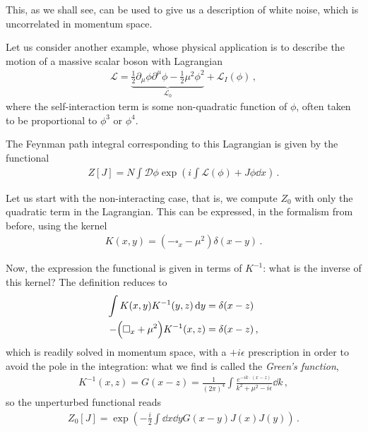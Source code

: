 \documentclass[main.tex]{subfiles}
\begin{document}
This, as we shall see, can be used to give us a description of white noise, which is uncorrelated in momentum space.

Let us consider another example, whose physical application is to describe the motion of a massive scalar boson with Lagrangian 
%
\begin{align}
\mathscr{L} = \underbrace{\frac{1}{2} \partial_{\mu } \phi \partial^{\mu } \phi - \frac{1}{2} \mu^2 \phi^2}_{\mathscr{L}_{0}}+ \mathscr{L}_I (\phi )
\,,
\end{align}
%
where the self-interaction term is some non-quadratic function of \(\phi \), often taken to be proportional to  \(\phi^3\)  or \(\phi^{4}\). 

The Feynman path integral corresponding to this Lagrangian is given by the functional 
%
\begin{align}
Z[J] = N \int \mathcal{D} \phi \exp(i \int \mathscr{L}(\phi ) +  J \phi \dd{x} )
\,.
\end{align}

Let us start with the non-interacting case, that is, we compute \(Z_0 \) with only the quadratic term in the Lagrangian. This can be expressed, in the formalism from before, using the kernel 
%
\begin{align}
K(x, y )= (- \square_x - \mu^2 ) \delta (x-y)
\,.
\end{align}

Now, the expression the functional is given in terms of \(K^{-1}\): what is the inverse of this kernel? The definition reduces to 
%
\begin{align}
\int K(x, y) K^{-1}(y, z) \dd{y} &= \delta (x-z)   \\
- \qty(\square_x + \mu^2) K^{-1} (x, z) &= \delta (x-z)
\,,
\end{align}
%
which is readily solved in momentum space, with a \(+i \epsilon \) prescription in order to avoid the pole in the integration: what we find is called the \emph{Green's function}, 
%
\begin{align}
K^{-1}(x, z) = G(x-z) = \frac{1}{(2 \pi )^{4}} \int \frac{e^{-ik \cdot (x-z)}}{k^2 + \mu^2 - i \epsilon } \dd{k} 
\,,
\end{align}
%
so the unperturbed functional reads 
%
\begin{align}
Z_0 [J] = \exp(- \frac{i}{2} \int \dd{x} \dd{y} G(x-y) J(x) J(y))
\,.
\end{align}

\end{document}
